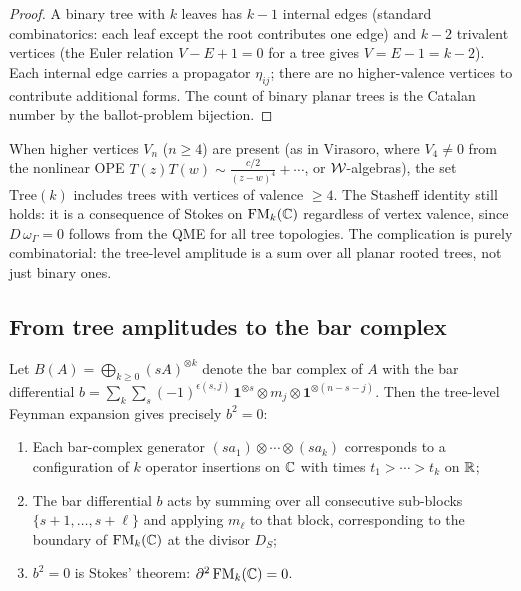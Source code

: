 \begin{proof}
A binary tree with $k$ leaves has $k - 1$ internal edges (standard
combinatorics: each leaf except the root contributes one edge) and
$k - 2$ trivalent vertices (the Euler relation $V - E + 1 = 0$ for
a tree gives $V = E - 1 = k - 2$). Each internal edge carries a
propagator $\eta_{ij}$; there are no higher-valence vertices to
contribute additional forms. The count of binary planar trees is
the Catalan number by the ballot-problem bijection.
\end{proof}

\begin{remark}
When higher vertices $V_n$ ($n \ge 4$) are present (as in
Virasoro, where $V_4 \ne 0$ from the nonlinear OPE
$T(z)T(w) \sim \frac{c/2}{(z-w)^4} + \cdots$, or
$\mathcal{W}$-algebras), the set $\mathrm{Tree}(k)$ includes trees with
vertices of valence $\ge 4$. The Stasheff identity still holds:
it is a consequence of Stokes on $\operatorname{FM}_k(\mathbb{C})$ regardless of
vertex valence, since $D\,\omega_\Gamma = 0$ follows from the
QME for all tree topologies. The complication is purely
combinatorial: the tree-level amplitude is a sum over all
planar rooted trees, not just binary ones.
\end{remark}

\subsection{From tree amplitudes to the bar complex}

\begin{theorem}[Tree amplitudes $=$ bar differential;
\ClaimStatusProvedHere]
\label{thm:thqg-bv-ext-trees-bar}
Let $B(A) = \bigoplus_{k \ge 0} (sA)^{\otimes k}$ denote the
bar complex of $A$ with the bar differential
$b = \sum_{k} \sum_{s} (-1)^{\epsilon(s,j)}\,
\mathbf{1}^{\otimes s} \otimes m_j \otimes
\mathbf{1}^{\otimes(n-s-j)}$.
Then the tree-level Feynman expansion gives precisely $b^2 = 0$:
\begin{enumerate}[label=(\roman*)]
\item Each bar-complex generator $(sa_1) \otimes \cdots \otimes
 (sa_k)$ corresponds to a configuration of $k$ operator
 insertions on $\mathbb{C}$ with times $t_1 > \cdots > t_k$ on $\mathbb{R}$;
\item The bar differential $b$ acts by summing over all consecutive
 sub-blocks $\{s+1, \ldots, s+\ell\}$ and applying
 $m_\ell$ to that block, corresponding to the boundary of $\operatorname{FM}_k(\mathbb{C})$
 at the divisor $D_S$;
\item $b^2 = 0$ is Stokes' theorem:
 $\partial^2\operatorname{FM}_k(\mathbb{C}) = 0$.
\end{enumerate}
\end{theorem}

